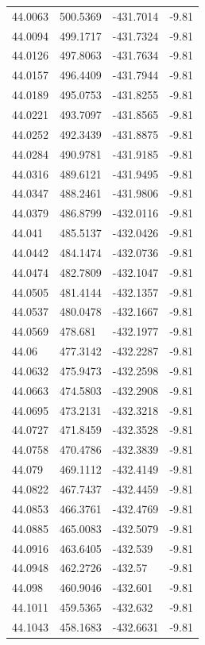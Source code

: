 \begin{table}[H]
\begin{tabular}{llll}
44.0063 & 500.5369 & -431.7014 & -9.81 \\
44.0094 & 499.1717 & -431.7324 & -9.81 \\
44.0126 & 497.8063 & -431.7634 & -9.81 \\
44.0157 & 496.4409 & -431.7944 & -9.81 \\
44.0189 & 495.0753 & -431.8255 & -9.81 \\
44.0221 & 493.7097 & -431.8565 & -9.81 \\
44.0252 & 492.3439 & -431.8875 & -9.81 \\
44.0284 & 490.9781 & -431.9185 & -9.81 \\
44.0316 & 489.6121 & -431.9495 & -9.81 \\
44.0347 & 488.2461 & -431.9806 & -9.81 \\
44.0379 & 486.8799 & -432.0116 & -9.81 \\
44.041 & 485.5137 & -432.0426 & -9.81 \\
44.0442 & 484.1474 & -432.0736 & -9.81 \\
44.0474 & 482.7809 & -432.1047 & -9.81 \\
44.0505 & 481.4144 & -432.1357 & -9.81 \\
44.0537 & 480.0478 & -432.1667 & -9.81 \\
44.0569 & 478.681 & -432.1977 & -9.81 \\
44.06 & 477.3142 & -432.2287 & -9.81 \\
44.0632 & 475.9473 & -432.2598 & -9.81 \\
44.0663 & 474.5803 & -432.2908 & -9.81 \\
44.0695 & 473.2131 & -432.3218 & -9.81 \\
44.0727 & 471.8459 & -432.3528 & -9.81 \\
44.0758 & 470.4786 & -432.3839 & -9.81 \\
44.079 & 469.1112 & -432.4149 & -9.81 \\
44.0822 & 467.7437 & -432.4459 & -9.81 \\
44.0853 & 466.3761 & -432.4769 & -9.81 \\
44.0885 & 465.0083 & -432.5079 & -9.81 \\
44.0916 & 463.6405 & -432.539 & -9.81 \\
44.0948 & 462.2726 & -432.57 & -9.81 \\
44.098 & 460.9046 & -432.601 & -9.81 \\
44.1011 & 459.5365 & -432.632 & -9.81 \\
44.1043 & 458.1683 & -432.6631 & -9.81 \\

\end{tabular}
\end{table}
